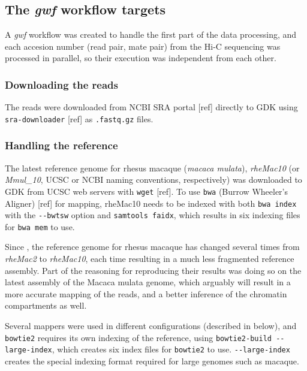 \documentclass[
  11pt,
  a4paper,
]{scrbook}
\let\oldemph\emph
\renewcommand\emph[1]{\oldemph{\color{gray}#1}}
\begin{document}
\subsection{\texorpdfstring{The \emph{gwf} workflow
targets}{The gwf workflow targets}}\label{the-gwf-workflow-targets}

A \emph{gwf} workflow was created to handle the first part of the data
processing, and each accesion number (read pair, mate pair) from the
Hi-C sequencing was processed in parallel, so their execution was
independent from each other.

\subsubsection{Downloading the reads}\label{downloading-the-reads}

The reads were downloaded from NCBI SRA portal {[}ref{]} directly to GDK
using \texttt{sra-downloader} {[}ref{]} as \texttt{.fastq.gz} files.

\subsubsection{Handling the reference}\label{handling-the-reference}

The latest reference genome for rhesus macaque (\emph{macaca mulata}),
\emph{rheMac10} (or \emph{Mmul\_10}, UCSC or NCBI naming conventions,
respectively) was downloaded to GDK from UCSC web servers with
\texttt{wget} {[}ref{]}. To use \texttt{bwa} (Burrow Wheeler's Aligner)
{[}ref{]} for mapping, rheMac10 needs to be indexed with both
\texttt{bwa\ index} with the \texttt{-\/-bwtsw} option and
\texttt{samtools\ faidx}, which results in six indexing files for
\texttt{bwa\ mem} to use.

Since \citeyearpar{wang_reprogramming_2019}, the reference genome for
rhesus macaque has changed several times from \emph{rheMac2} to
\emph{rheMac10}, each time resulting in a much less fragmented reference
assembly. Part of the reasoning for reproducing their results was doing
so on the latest assembly of the Macaca mulata genome, which arguably
will result in a more accurate mapping of the reads, and a better
inference of the chromatin compartments as well.

Several mappers were used in different configurations (described in
below), and \texttt{bowtie2} requires its own indexing of the reference,
using \texttt{bowtie2-build\ -\/-large-index}, which creates six index
files for \texttt{bowtie2} to use. \texttt{-\/-large-index} creates the
special indexing format required for large genomes such as macaque.
\end{document}
